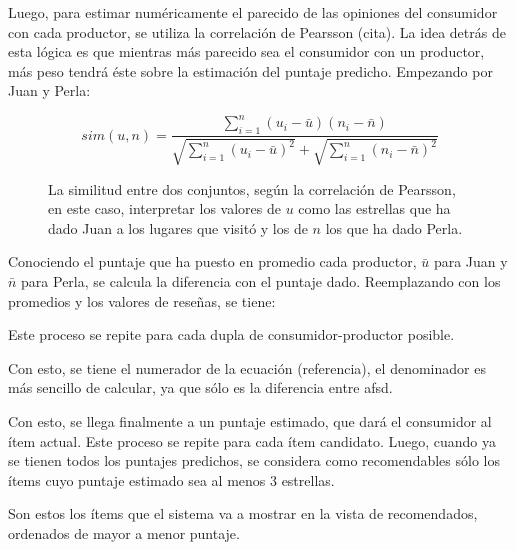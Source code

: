 Luego, para estimar numéricamente el parecido de las opiniones del consumidor con cada productor, se utiliza la correlación de Pearsson (cita). La idea detrás de esta lógica es que mientras más parecido sea el consumidor con un productor, más peso tendrá éste sobre la estimación del puntaje predicho. Empezando por Juan y Perla:

\begin{figure}

\begin{equation}
sim(u,n)=\frac{\sum_{i=1}^{n}(u_i-\bar{u})(n_i-\bar{n})}{\sqrt{\sum_{i=1}^{n}(u_i-\bar{u})^2}+\sqrt{\sum_{i=1}^{n}(n_i-\bar{n})^2}}
\end{equation}
\caption{La similitud entre dos conjuntos, según la correlación de Pearsson, en este caso, interpretar los valores de $u$ como las estrellas que ha dado Juan a los lugares que visitó y los de $n$ los que ha dado Perla. }

\end{figure}
Conociendo el puntaje que ha puesto en promedio cada productor, $\bar{u}$ para Juan y $\bar{n}$ para Perla, se calcula la diferencia con el puntaje dado. Reemplazando con los promedios y los valores de reseñas, se tiene:





Este proceso se repite para cada dupla de consumidor-productor posible.

Con esto, se tiene el numerador de la ecuación (referencia), el denominador es más sencillo de calcular, ya que sólo es la diferencia entre afsd.

Con esto, se llega finalmente a un puntaje estimado, que dará el consumidor al ítem actual. Este proceso se repite para cada ítem candidato.
Luego, cuando ya se tienen todos los puntajes predichos, se considera como recomendables sólo los ítems cuyo puntaje estimado sea al menos 3 estrellas.


Son estos los ítems que el sistema va a mostrar en la vista de recomendados, ordenados de mayor a menor puntaje. 






